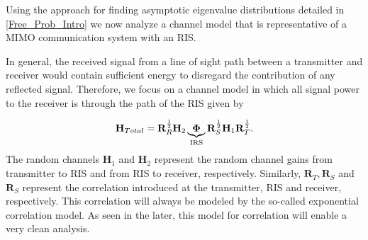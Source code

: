 Using the approach for finding asymptotic eigenvalue distributions detailed in \ref{Free_Prob_Intro} we now analyze a channel model that is representative of a MIMO communication system with an RIS. 
\par
In general, the received signal from a line of sight path between a transmitter and receiver would contain  sufficient energy to disregard the contribution of any reflected signal.  Therefore, we focus on a channel model in which all signal power to the receiver is through the path of the RIS  given by

	\begin{equation}\label{correlated_channel}
	\mathbf{H}_{Total} = \mathbf{R}_{R}^{\frac{1}{2}}\mathbf{H}_{2}\underbrace{\boldsymbol{\Phi}}_{\text{IRS}}\mathbf{R}_{S}^{\frac{1}{2}}\mathbf{H}_{1}\mathbf{R}_{T}^{\frac{1}{2}}.
	\end{equation}
The random channels $\mathbf{H}_{1}$ and $\mathbf{H}_{2}$ represent the random channel gains from transmitter to RIS and from RIS to receiver, respectively. Similarly, $ \mathbf{R}_{T},  \mathbf{R}_{S} $ and  $\mathbf{R}_{S}$ represent the correlation introduced at the transmitter, RIS and receiver, respectively. 
This correlation will always be modeled by the so-called exponential correlation model. As seen in the later, this model for correlation will enable a very clean analysis.
\par

